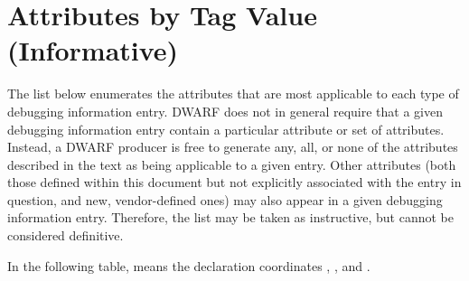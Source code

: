 \chapter[Attributes by Tag (Informative)]{Attributes by Tag Value (Informative)}
\label{chap:attributesbytagvalueinformative}

The list below enumerates the attributes that are
most applicable to each type of debugging information
entry. DWARF does not in general require that a given
debugging information entry contain a particular attribute
or set of attributes. Instead, a DWARF producer is free to
generate any, all, or none of the attributes described in the
text as being applicable to a given entry. Other attributes
(both those defined within this document but not explicitly
associated with the entry in question, and new, vendor-defined
ones) may also appear in a given debugging information
entry. Therefore, the list may be taken as instructive, but
cannot be considered definitive.  

In the following table,
means 
the 
declaration coordinates 
,
, and 
.



